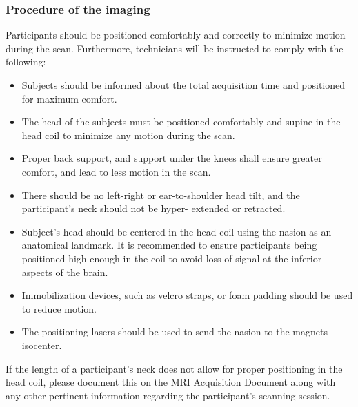 \subsubsection{Procedure of the imaging}
Participants should be positioned comfortably and correctly to minimize motion during the scan. Furthermore, technicians will be instructed to comply with the following:
\begin{itemize}
\item Subjects should be informed about the total acquisition time and positioned for maximum comfort.
\item The head of the subjects must be positioned comfortably and supine in the head coil to minimize any motion during the scan.
\item Proper back support, and support under the knees shall ensure greater comfort, and lead to less motion in the scan.
\item There should be no left-right or ear-to-shoulder head tilt, and the participant’s neck should not be hyper- extended or retracted.
\item Subject's head should be centered in the head coil using the nasion as an anatomical landmark. It is recommended to ensure participants being positioned high enough in the coil to avoid loss of signal at the inferior aspects of the brain.
\item Immobilization devices, such as velcro straps, or foam padding should be used to reduce motion.
\item The positioning lasers should be used to send the nasion to the magnets isocenter.
\end{itemize}
If the length of a participant's neck does not allow for proper positioning in the head coil, please document this on the \ac{MRI} Acquisition Document along with any other pertinent information regarding the participant's scanning session.

